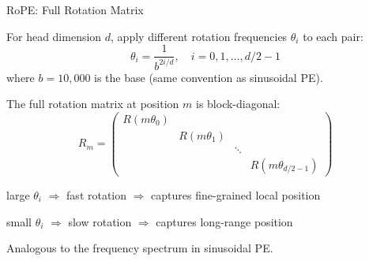 \begin{frame}{RoPE: Full Rotation Matrix}

  For head dimension $d$, apply different rotation frequencies $\theta_i$ to each pair:
  \[
    \theta_i = \frac{1}{b^{2i/d}}, \quad i = 0, 1, \ldots, d/2 - 1
  \]
  where $b = 10{,}000$ is the base (same convention as sinusoidal PE).

  \vspace{0.3em}
  The full rotation matrix at position $m$ is block-diagonal:
  \[
    R_m = \begin{pmatrix}
      R(m\theta_0) & & \\
      & R(m\theta_1) & \\
      & & \ddots \\
      & & & R(m\theta_{d/2-1})
    \end{pmatrix}
  \]

  \vspace{0.3em}
  \begin{description}[labelwidth=\widthof{\bfseries High dimensions:~~}, leftmargin=!]
    \item[Low dimensions:] large $\theta_i$ $\Rightarrow$ fast rotation $\Rightarrow$ captures fine-grained local position
    \item[High dimensions:] small $\theta_i$ $\Rightarrow$ slow rotation $\Rightarrow$ captures long-range position
  \end{description}

  Analogous to the frequency spectrum in sinusoidal PE.

\end{frame}

